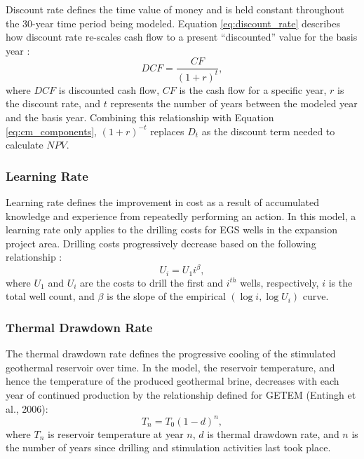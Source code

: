 Discount rate defines the time value of money and is held constant throughout the 30-year time period being modeled. Equation \ref{eq:discount_rate} describes how discount rate re-scales cash flow to a present ``discounted'' value for the basis year \citep[p.\ 199]{de_neufville_flexibility_2011}:
\begin{equation}
    \label{eq:discount_rate}
    DCF = \frac{CF}{(1+r)^t},
\end{equation}
where $DCF$ is discounted cash flow, $CF$ is the cash flow for a specific year,  $r$ is the discount rate, and $t$ represents the number of years between the modeled year and the basis year. Combining this relationship with Equation \ref{eq:cm_components}, $(1+r)^{-t}$ replaces $D_t$ as the discount term needed to calculate $NPV$.

\subsubsection{Learning Rate}\label{ch4:learn_rate}

Learning rate defines the improvement in cost as a result of accumulated knowledge and experience from repeatedly performing an action. In this model, a learning rate only applies to the drilling costs for EGS wells in the expansion project area. Drilling costs progressively decrease based on the following relationship \citep[p.\ 213]{de_neufville_flexibility_2011}:
\begin{equation}
    \label{eq:learning_rate}
    U_i = U_1 %
    i^\beta,
\end{equation}
where $U_1$ and $U_i$ are the costs to drill the first and $i^{th}$ wells, respectively, $i$ is the total well count, and $\beta$ is the slope of the empirical %
$(\log i,\log U_i)$ curve.

\subsubsection{Thermal Drawdown Rate}\label{ch4:drawdown_rate}

The thermal drawdown rate defines the progressive cooling of the stimulated geothermal reservoir over time. In the model, the reservoir temperature, and hence the temperature of the produced geothermal brine, decreases with each year of continued production by the relationship defined for GETEM (Entingh et al., 2006):
\begin{equation}
    \label{eq:drawdown}
    T_n = T_0 %
    (1-d)^n,
\end{equation}
where $T_n$ is reservoir temperature at year $n$, $d$ is thermal drawdown rate, and $n$ is the number of years since drilling and stimulation activities last took place.

